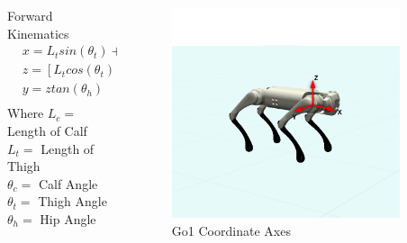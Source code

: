 \documentclass{beamer}
\begin{document}
\begin{frame}
    \begin{columns}[T]
        \begin{column}{.55\textwidth}
         \begin{block}{Forward Kinematics}
            \begin{align*}
                &x = L_t sin(\theta_t) + L_c sin(\theta_t + \theta_c) \\
                &z = [L_t cos(\theta_t) + L_c cos(\theta_t + \theta_c)]cos(\theta_h) \\
                &y = ztan(\theta_h)\\
            \end{align*}
            Where
            $L_c = $ Length of Calf \\
            $L_t =$ Length of Thigh \\
            $\theta_c=$ Calf Angle 
            $\theta_t=$ Thigh Angle \\
            $\theta_h =$ Hip Angle 
        \end{block}
        \end{column}
        \begin{column}{.45\textwidth}
        \begin{block}{}
        \begin{figure}
            \includegraphics[width=0.9\textwidth, height=0.5\textheight]{../images/coords_fix.png}
            \caption{Go1 Coordinate Axes}
        \end{figure}
        \end{block}
        \end{column}
      \end{columns}

\end{frame}
\end{document}
